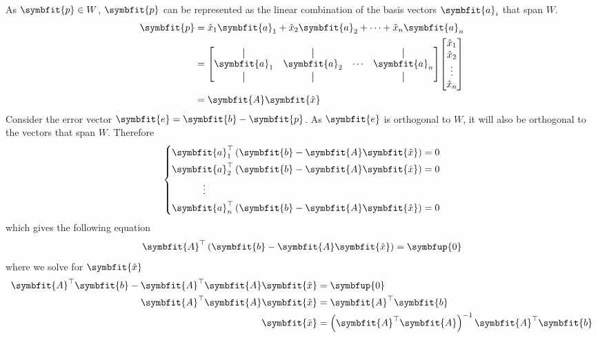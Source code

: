 \documentclass{article}
\begin{document}
	\begin{solution}[Proof]
		As $\symbfit{p}\in W$, $\symbfit{p}$ can be represented as the linear combination of the basis vectors $\symbfit{a}_i$ that span $W$.
		\begin{align*}
			\symbfit{p} &= \hat{x}_1 \symbfit{a}_1 + \hat{x}_2 \symbfit{a}_2 + \dots + \hat{x}_n \symbfit{a}_n \\
			&= \mqty[
					\vertbar & \vertbar & & \vertbar \\ 
					\symbfit{a}_1 & \symbfit{a}_2 & \cdots & \symbfit{a}_n \\ 
					\vertbar & \vertbar & & \vertbar
				] 
				\mqty[
					\hat{x}_1 \\ 
					\hat{x}_2 \\ 
					\vdots \\ 
					\hat{x}_n
				] \\
			&= \symbfit{A}\symbfit{\hat{x}}
		\end{align*}
		Consider the error vector $\symbfit{e}=\symbfit{b}-\symbfit{p}$. As $\symbfit{e}$ is orthogonal to $W$, it will also be orthogonal to the vectors that span $W$. Therefore
		\begin{equation*}
			\left\{
				\begin{aligned}
					\symbfit{a}_1^\top\left( \symbfit{b}-\symbfit{A}\symbfit{\hat{x}} \right) &= 0 \\
					\symbfit{a}_2^\top\left( \symbfit{b}-\symbfit{A}\symbfit{\hat{x}} \right) &= 0 \\
					\vdotswithin{\symbfit{a}_3^\top}\phantom{\left( \symbfit{b}-\symbfit{A}\symbfit{\hat{x}} \right)} & \\
					\symbfit{a}_n^\top\left( \symbfit{b}-\symbfit{A}\symbfit{\hat{x}} \right) &= 0 
				\end{aligned}
			\right.
		\end{equation*}
		which gives the following equation
		\begin{equation*}
			\symbfit{A}^\top \left( \symbfit{b}-\symbfit{A}\symbfit{\hat{x}} \right) = \symbfup{0}
		\end{equation*}
		where we solve for $\symbfit{\hat{x}}$
		\begin{align*}
			\symbfit{A}^\top \symbfit{b}-\symbfit{A}^\top \symbfit{A}\symbfit{\hat{x}} &= \symbfup{0} \\
			\symbfit{A}^\top \symbfit{A}\symbfit{\hat{x}} &= \symbfit{A}^\top \symbfit{b} \\
			\symbfit{\hat{x}} &= \left( \symbfit{A}^\top \symbfit{A} \right)^{-1}\symbfit{A}^\top \symbfit{b}
		\end{align*}
	\end{solution}
\end{document}
